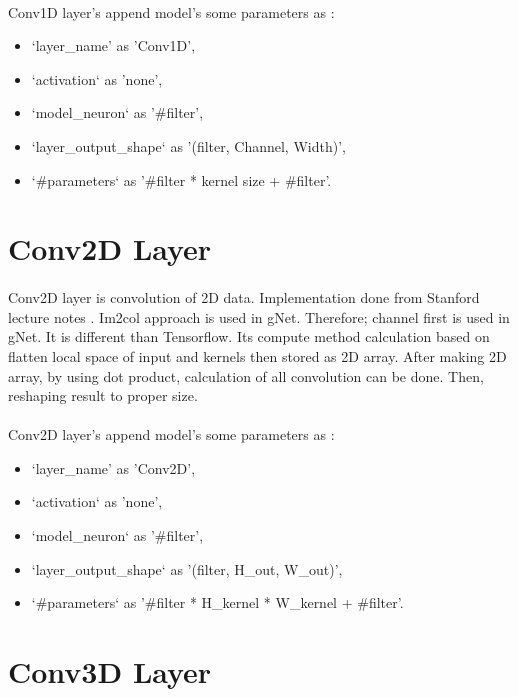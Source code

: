 \documentclass[12pt]{report}
\begin{document}
\paragraph{}
Conv1D layer's append model's some parameters as :
\begin{itemize}
	\item `layer\_name' as 'Conv1D',
	\item `activation` as 'none',
	\item `model\_neuron` as '\#filter',
	\item `layer\_output\_shape` as '(filter, Channel, Width)',
	\item `\#parameters` as '\#filter * kernel size + \#filter'.
\end{itemize}



\section{Conv2D Layer}

\paragraph{}
Conv2D layer is convolution of 2D data. Implementation done from Stanford lecture notes \cite{cs231}. Im2col approach is used in gNet. Therefore; channel first is used in gNet. It is different than Tensorflow. Its compute method calculation based on flatten local space of input and kernels then stored as 2D array. After making 2D array, by using dot product, calculation of all convolution can be done. Then, reshaping result to proper size. 

\paragraph{}
Conv2D layer's append model's some parameters as :
\begin{itemize}
	\item `layer\_name' as 'Conv2D',
	\item `activation` as 'none',
	\item `model\_neuron` as '\#filter',
	\item `layer\_output\_shape` as '(filter, H\_out, W\_out)',
	\item `\#parameters` as '\#filter * H\_kernel * W\_kernel + \#filter'.
\end{itemize}



\section{Conv3D Layer}
\end{document}
